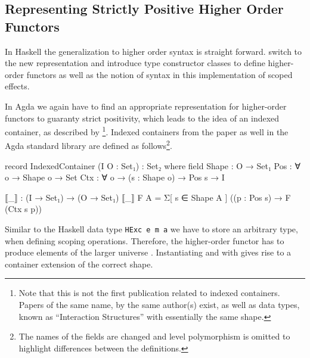 \subsection{Representing Strictly Positive Higher Order Functors}
\label{higher-order:container}

In Haskell the generalization to higher order syntax is straight forward.
\textcite{DBLP:conf/haskell/WuSH14} switch to the new representation and
introduce type constructor classes to define higher-order functors as well as
the notion of syntax in this implementation of scoped effects.

In Agda we again have to find an appropriate representation for higher-order
functors to guaranty strict positivity, which leads to the idea of an indexed
container, as described by \textcite{DBLP:journals/jfp/AltenkirchGHMM15}
\footnote{Note that this is not the first publication related to indexed
  containers. Papers of the same name, by the same author(s) exist, as well as
  data types, known as ``Interaction Structures'' with essentially the same
  shape.}. 
Indexed containers from the paper as well in the Agda standard library are
defined as follows\footnote{The names of the fields are changed and level
  polymorphism is omitted to highlight differences between the definitions.}.

\begin{code}
record IndexedContainer (I O : Set₁) : Set₂ where
  field
    Shape : O → Set₁
    Pos : ∀ {o} → Shape o → Set
    Ctx : ∀ {o} → (s : Shape o) → Pos s → I

  ⟦_⟧ : (I → Set₁) → (O → Set₁)
  ⟦_⟧ F A = Σ[ s ∈ Shape A ] ((p : Pos s) → F (Ctx s p))
\end{code}
Similar to the Haskell data type \texttt{HExc e m a} we
have to store an arbitrary type, when defining scoping operations.
Therefore, the higher-order functor has to produce elements of the larger
universe .
Instantiating  and  with 
gives rise to a container extension of the correct shape.

